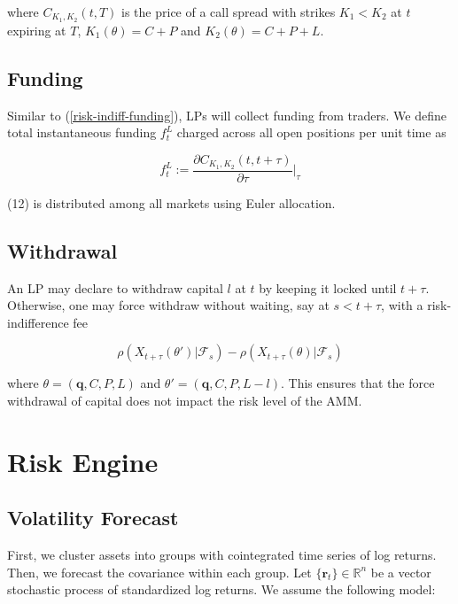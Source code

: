 \documentclass{article}
\begin{document}
where $C_{K_1, K_2}(t, T)$ is the price of a call spread with strikes $K_1 < K_2$ at $t$ expiring at $T$, $K_1(\theta) = C + P$ and $K_2(\theta) = C+P+L$. 

\subsection{Funding}

Similar to (\ref{risk-indiff-funding}), LPs will collect funding from traders. We define total instantaneous funding $f^L_t$ charged across all open positions per unit time as

\begin{equation}
    f^L_t := \frac{\partial C_{K_1,K_2}(t,t+\tau)}{\partial \tau} |_{\tau}
\end{equation}

(12) is distributed among all markets using Euler allocation.

\subsection{Withdrawal}
An LP may declare to withdraw capital $l$ at $t$ by keeping it locked until $t+\tau$. Otherwise, one may force withdraw without waiting, say at $s < t+\tau$, 
with a risk-indifference fee 

\begin{equation}
    \rho(X_{t+\tau}(\theta')|\mathcal{F}_{s}) -\rho(X_{t+\tau}(\theta)|\mathcal{F}_{s})
\end{equation}

where $\theta = (\mathbf{q}, C, P, L)$ and $\theta' = (\mathbf{q}, C, P, L - l)$. This ensures that the force withdrawal of capital does not impact the risk level of the AMM.

\section{Risk Engine}

\subsection{Volatility Forecast}\label{vol}

First, we cluster assets into groups with cointegrated time series of log returns. Then, we forecast the covariance within each group. Let $\{\mathbf{r}_t\} \in \mathbb{R}^n$ be a vector stochastic process of standardized log returns. We assume the following model:
\end{document}
